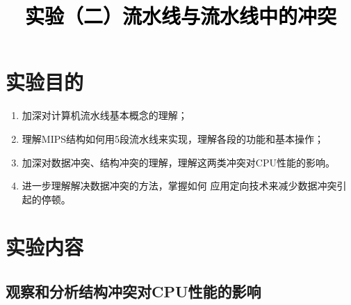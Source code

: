\documentclass[a4paper,twoside]{article}
\newcommand{\PaperTitle}{实验（二）流水线与流水线中的冲突}  %
\begin{document}
\newpage

\title{
	\Large{\textcolor{black}{\PaperTitle}}
}
	
	
\maketitle
	
\tableofcontents
 
\newpage
\setcounter{page}{1}

\begin{spacing}{1.2}

\section{实验目的}

\begin{enumerate}
	\item 加深对计算机流水线基本概念的理解；
	\item 理解MIPS结构如何用5段流水线来实现，理解各段的功能和基本操作；
	\item 加深对数据冲突、结构冲突的理解，理解这两类冲突对CPU性能的影响。
	\item 进一步理解解决数据冲突的方法，掌握如何 应用定向技术来减少数据冲突引起的停顿。
\end{enumerate}

\section{实验内容}

\subsection{观察和分析结构冲突对CPU性能的影响}


\end{spacing}
\end{document}
